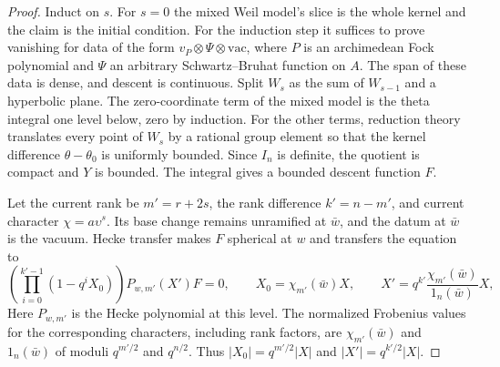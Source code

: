 \begin{proof}
Induct on $s$. For $s=0$ the mixed Weil model's slice is the whole kernel and the claim is the initial condition. For the induction step it suffices to prove vanishing for data of the form $v_P\otimes\Psi\otimes\mathrm{vac}$, where $P$ is an archimedean Fock polynomial and $\Psi$ an arbitrary Schwartz--Bruhat function on $A$. The span of these data is dense, and descent is continuous. Split $W_s$ as the sum of $W_{s-1}$ and a hyperbolic plane. The zero-coordinate term of the mixed model is the theta integral one level below, zero by induction. For the other terms, reduction theory translates every point of $W_s$ by a rational group element so that the kernel difference $\theta-\theta_0$ is uniformly bounded. Since $I_n$ is definite, the quotient is compact and $Y$ is bounded. The integral gives a bounded descent function $F$.

Let the current rank be $m'=r+2s$, the rank difference $k'=n-m'$, and current character $\chi=a\upsilon^s$. Its base change remains unramified at $\bar w$, and the datum at $\bar w$ is the vacuum. Hecke transfer makes $F$ spherical at $w$ and transfers the equation to
\[
 \left(\prod_{i=0}^{k'-1}(1-q^i X_0)\right)P_{w,m'}(X')F=0,
 \qquad
 X_0=\chi_{m'}(\bar w)X,\qquad
 X'=q^{k'}\frac{\chi_{m'}(\bar w)}{1_n(\bar w)}X ,
\]
Here $P_{w,m'}$ is the Hecke polynomial at this level. The normalized Frobenius values for the corresponding characters, including rank factors, are $\chi_{m'}(\bar w)$ and $1_n(\bar w)$ of moduli $q^{m'/2}$ and $q^{n/2}$. Thus $|X_0|=q^{m'/2}|X|$ and $|X'|=q^{k'/2}|X|$.


\end{proof}
